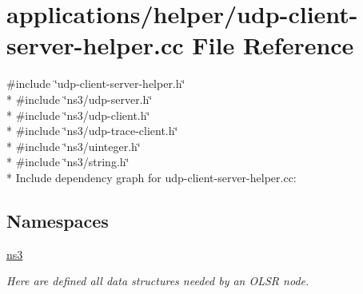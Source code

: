 \hypertarget{udp-client-server-helper_8cc}{}\section{applications/helper/udp-\/client-\/server-\/helper.cc File Reference}
\label{udp-client-server-helper_8cc}
{\ttfamily \#include \char`\"{}udp-\/client-\/server-\/helper.\+h\char`\"{}}\\*
{\ttfamily \#include \char`\"{}ns3/udp-\/server.\+h\char`\"{}}\\*
{\ttfamily \#include \char`\"{}ns3/udp-\/client.\+h\char`\"{}}\\*
{\ttfamily \#include \char`\"{}ns3/udp-\/trace-\/client.\+h\char`\"{}}\\*
{\ttfamily \#include \char`\"{}ns3/uinteger.\+h\char`\"{}}\\*
{\ttfamily \#include \char`\"{}ns3/string.\+h\char`\"{}}\\*
Include dependency graph for udp-\/client-\/server-\/helper.cc\+:
\subsection*{Namespaces}
\begin{DoxyCompactItemize}
\item 
 \hyperlink{namespacens3}{ns3}
\begin{DoxyCompactList}\small\item\em Here are defined all data structures needed by an O\+L\+SR node. \end{DoxyCompactList}\end{DoxyCompactItemize}
